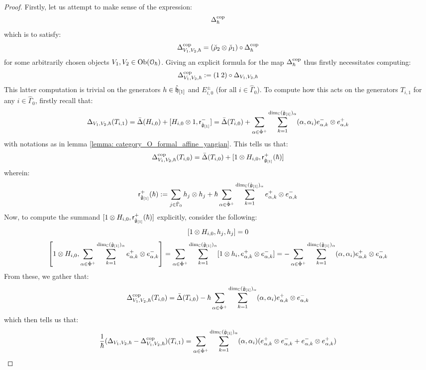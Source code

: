 \begin{proof}
                Firstly, let us attempt to make sense of the expression:
                    $$\Delta_{\hbar}^{\mathrm{cop}}$$
                which is to satisfy:
                    $$\Delta_{V_1, V_2, \hbar}^{\cop} = (\breve{\rho}_2 \tensor \breve{\rho}_1) \circ \Delta_{\hbar}^{\cop}$$
                for some arbitrarily chosen objects $V_1, V_2 \in \mathrm{Ob}( \mathcal{O}_{\hbar} )$. Giving an explicit formula for the map $\Delta_{\hbar}^{\mathrm{cop}}$ thus firstly necessitates computing:
                    $$\Delta_{V_1, V_2, \hbar}^{\mathrm{cop}} := (1 \: 2) \circ \Delta_{V_1, V_2, \hbar}$$
                This latter computation is trivial on the generators $h \in \hat{\mathfrak{h}}_{[1]}$ and $E_{i, 0}^{\pm}$ (for all $i \in \hat{\Gamma}_0$). To compute how this acts on the generators $T_{i, 1}$ for any $i \in \hat{\Gamma}_0$, firstly recall that:
                    $$\Delta_{V_1, V_2, \hbar}(T_{i, 1}) = \bar{\Delta}(H_{i, 0}) + [H_{i, 0} \tensor 1, \sfr_{ \hat{\g}_{[1]} }^-] = \bar{\Delta}(T_{i, 0}) + \sum_{\alpha \in \hat{\Phi}^+} \sum_{k = 1}^{ \dim_{\bbC} (\hat{\g}_{[1]})_{\alpha} } (\alpha, \alpha_i) e_{\alpha, k}^- \tensor e_{\alpha, k}^+$$
                with notations as in lemma \ref{lemma: category_O_formal_affine_yangian}. This tells us that:
                    $$\Delta_{V_1, V_2, \hbar}^{\cop}(T_{i, 0}) = \bar{\Delta}(T_{i, 0}) + [1 \tensor H_{i, 0}, \sfr_{ \hat{\g}_{[1]} }^+(\hbar)]$$
                wherein:
                    $$\sfr_{ \hat{\g}_{[1]} }^+(\hbar) := \sum_{j \in \hat{\Gamma}_0} h_j \tensor h_j + \hbar \sum_{\alpha \in \hat{\Phi}^+} \sum_{k = 1}^{ \dim_{\bbC} (\hat{\g}_{[1]})_{\alpha} } e_{\alpha, k}^+ \tensor e_{\alpha, k}^-$$
                Now, to compute the summand $[1 \tensor H_{i, 0}, \sfr_{ \hat{\g}_{[1]} }^+(\hbar)]$ explicitly, consider the following:
                    $$[1 \tensor H_{i, 0}, h_j, h_j] = 0$$
                    $$\left[1 \tensor H_{i, 0}, \sum_{\alpha \in \hat{\Phi}^+} \sum_{k = 1}^{ \dim_{\bbC} (\hat{\g}_{[1]})_{\alpha} } e_{\alpha, k}^+ \tensor e_{\alpha, k}^-\right] = \sum_{\alpha \in \hat{\Phi}^+} \sum_{k = 1}^{ \dim_{\bbC} (\hat{\g}_{[1]})_{\alpha} } [1 \tensor h_i, e_{\alpha, k}^+ \tensor e_{\alpha, k}^-] = -\sum_{\alpha \in \hat{\Phi}^+} \sum_{k = 1}^{ \dim_{\bbC} (\hat{\g}_{[1]})_{\alpha} } (\alpha, \alpha_i) e_{\alpha, k}^+ \tensor e_{\alpha, k}^-$$
                From these, we gather that:
                    $$\Delta_{V_1, V_2, \hbar}^{\cop}(T_{i, 0}) = \bar{\Delta}(T_{i, 0}) - \hbar \sum_{\alpha \in \hat{\Phi}^+} \sum_{k = 1}^{ \dim_{\bbC} (\hat{\g}_{[1]})_{\alpha} } (\alpha, \alpha_i) e_{\alpha, k}^+ \tensor e_{\alpha, k}^-$$
                which then tells us that:
                    $$\frac{1}{\hbar} (\Delta_{V_1, V_2, \hbar} - \Delta_{V_1, V_2, \hbar}^{\cop})(T_{i, 1}) = \sum_{\alpha \in \hat{\Phi}^+} \sum_{k = 1}^{ \dim_{\bbC} (\hat{\g}_{[1]})_{\alpha} } (\alpha, \alpha_i) ( e_{\alpha, k}^+ \tensor e_{\alpha, k}^- + e_{\alpha, k}^- \tensor e_{\alpha, k}^+ )$$
                

\end{proof}
